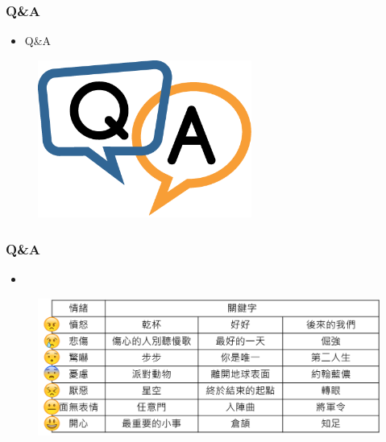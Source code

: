\documentclass[10pt, conference, compsocconf]{beamer}
\begin{document}
\begin{CJK}{UTF8}{}

\begin{frame}
\frametitle{Q\&A}
\begin{itemize}
\item\Large Q\&A
\end{itemize}
\begin{figure}[t]
\begin{center}
\includegraphics[width=7cm]{./Figures/qa.png}
\end{center}
\end{figure}
\end{frame}


\begin{frame}
\frametitle{Q\&A}
\begin{itemize}
\item{}
\end{itemize}
\begin{figure}[t]
\begin{center}
\includegraphics[width=12cm]{./Figures/5.png}
\end{center}
\end{figure}
\end{frame}


\end{CJK}
\end{document}
